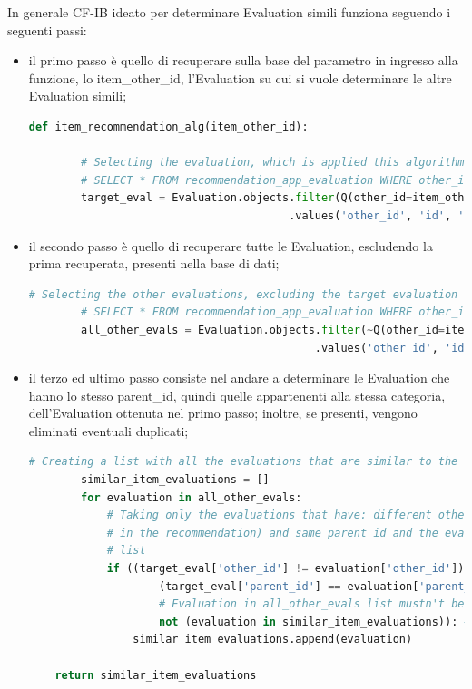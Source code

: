 In generale CF-IB ideato per determinare Evaluation simili funziona seguendo i seguenti passi:
\begin{itemize}
	\item il primo passo è quello di recuperare sulla base del parametro in ingresso alla funzione, lo item\_other\_id,
	l'Evaluation su cui si vuole determinare le altre Evaluation simili;
	\begin{lstlisting}[language=Python, label=lst:IB_CF_Evaluation_1]
	def item_recommendation_alg(item_other_id):

		# Selecting the evaluation, which is applied this algorithm, from its other_id
		# SELECT * FROM recommendation_app_evaluation WHERE other_id = %(item_other_id)s AND node_type = 'eva'
		target_eval = Evaluation.objects.filter(Q(other_id=item_other_id) & Q(node_type="eva"))\
										.values('other_id', 'id', 'parent_id')[0]
	\end{lstlisting} 
	\item il secondo passo è quello di recuperare tutte le Evaluation, escludendo la prima recuperata, presenti nella base di dati;
	\begin{lstlisting}[language=Python, label=lst:IB_CF_Evaluation_2]
		# Selecting the other evaluations, excluding the target evaluation
		# SELECT * FROM recommendation_app_evaluation WHERE other_id != %(item_other_id)s AND node_type = 'eva'
		all_other_evals = Evaluation.objects.filter(~Q(other_id=item_other_id) & Q(node_type="eva"))\
											.values('other_id', 'id', 'parent_id').order_by('other_id')
	\end{lstlisting}
	\item il terzo ed ultimo passo consiste nel andare a determinare le Evaluation che hanno lo stesso parent\_id, quindi
	quelle appartenenti alla stessa categoria, dell'Evaluation ottenuta nel primo passo; inoltre, se presenti, vengono 
	eliminati eventuali duplicati;
	\begin{lstlisting}[language=Python, label=lst:IB_CF_Evaluation_3]
		# Creating a list with all the evaluations that are similar to the target evaluation (comparing the parent_id)
		similar_item_evaluations = []
		for evaluation in all_other_evals:
			# Taking only the evaluations that have: different other_id (excluding the target evaluation
			# in the recommendation) and same parent_id and the evaluations that weren't added to similar_item_evaluations
			# list
			if ((target_eval['other_id'] != evaluation['other_id']) and  # Evaluations must have different 'other_id'
					(target_eval['parent_id'] == evaluation['parent_id']) and  # Evaluations must have same 'parent_id'
					# Evaluation in all_other_evals list mustn't be already added to \
					not (evaluation in similar_item_evaluations)): # the 'similar_item_evaluations' list
				similar_item_evaluations.append(evaluation)

	return similar_item_evaluations	
	\end{lstlisting}
\end{itemize}

